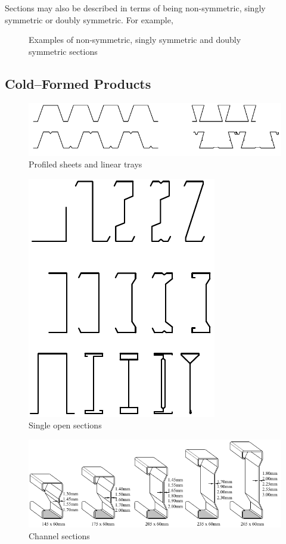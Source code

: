 Sections may also be described in terms of being non-symmetric, singly symmetric or doubly symmetric. For example,
\begin{figure}[H]
\centering

\caption{Examples of non-symmetric, singly symmetric and doubly symmetric sections}
\end{figure}
\subsection{Cold--Formed Products}
\begin{figure}[H]
\centering
\includegraphics[width=.9\textwidth]{PIC/CH02/SHEET}
\caption{Profiled sheets and linear trays \citep{Dubina2012}}
\end{figure}
\begin{figure}[H]
\centering
\includegraphics[width=.45\textwidth]{PIC/CH02/OPEN}
\caption{Single open sections \citep{Dubina2012}}
\end{figure}
\begin{figure}[H]
\centering
\includegraphics[width=.9\textwidth]{PIC/CH02/SUM}
\caption{Channel sections \citep{Dubina2012}}
\end{figure}
